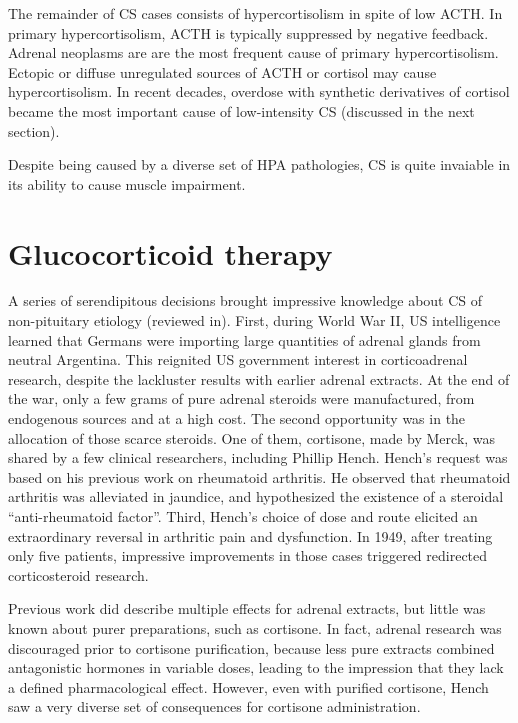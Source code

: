 \documentclass[12pt,english]{report}\usepackage[]{graphicx}\usepackage[]{color}
\begin{document}
The remainder of CS cases consists of hypercortisolism in spite of
low ACTH. In primary hypercortisolism, ACTH is typically suppressed
by negative feedback. Adrenal neoplasms are are the most frequent
cause of primary hypercortisolism. Ectopic or diffuse unregulated
sources of ACTH or cortisol may cause hypercortisolism. In recent
decades, overdose with synthetic derivatives of cortisol became the
most important cause of low-intensity CS (discussed in the next section).

Despite being caused by a diverse set of HPA pathologies, CS is quite
invaiable in its ability to cause muscle impairment.


\section{Glucocorticoid therapy}

A series of serendipitous decisions brought impressive knowledge about
CS of non-pituitary etiology (reviewed in\citep{glyn1998discovery}).
First, during World War II, US intelligence learned that Germans were
importing large quantities of adrenal glands from neutral Argentina.
This reignited US government interest in corticoadrenal research,
despite the lackluster results with earlier adrenal extracts. At the
end of the war, only a few grams of pure adrenal steroids were manufactured,
from endogenous sources and at a high cost. The second opportunity
was in the allocation of those scarce steroids. One of them, cortisone,
made by Merck, was shared by a few clinical researchers, including
Phillip Hench. Hench's request was based on his previous work on rheumatoid
arthritis. He observed that rheumatoid arthritis was alleviated in
jaundice, and hypothesized the existence of a steroidal ``anti-rheumatoid
factor''. Third, Hench's choice of dose and route elicited an extraordinary
reversal in arthritic pain and dysfunction. In 1949, after treating
only five patients\citep{hench1964reversibility}, impressive improvements
in those cases triggered redirected corticosteroid research.

Previous work did describe multiple effects for adrenal extracts,
but little was known about purer preparations, such as cortisone.
In fact, adrenal research was discouraged prior to cortisone purification,
because less pure extracts combined antagonistic hormones in variable
doses, leading to the impression that they lack a defined pharmacological
effect. However, even with purified cortisone, Hench saw a very diverse
set of consequences for cortisone administration\citep{sprague1950observations}.
\end{document}
